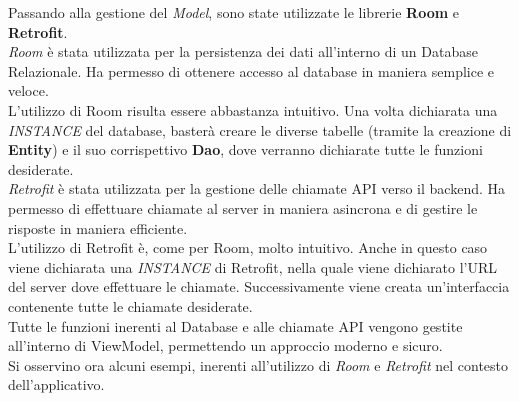 \documentclass{article}
\begin{document}
Passando alla gestione del \textit{Model}, sono state utilizzate le librerie \textbf{Room} e \textbf{Retrofit}.\vspace*{14pt}\\
\textit{Room} è stata utilizzata per la persistenza dei dati all'interno di un Database Relazionale. Ha permesso di ottenere accesso al database in maniera semplice e veloce.\\
L'utilizzo di Room risulta essere abbastanza intuitivo. Una volta dichiarata una \textit{INSTANCE} del database, basterà creare le diverse tabelle (tramite la creazione di \textbf{Entity}) e il suo corrispettivo \textbf{Dao}, dove verranno dichiarate tutte le funzioni desiderate.\vspace*{14pt}\\
\textit{Retrofit} è stata utilizzata per la gestione delle chiamate API verso il backend. Ha permesso di effettuare chiamate al server in maniera asincrona e di gestire le risposte in maniera efficiente.\\
L'utilizzo di Retrofit è, come per Room, molto intuitivo. Anche in questo caso viene dichiarata una \textit{INSTANCE} di Retrofit, nella quale viene dichiarato l'URL del server dove effettuare le chiamate. Successivamente viene creata un'interfaccia contenente tutte le chiamate desiderate.\vspace*{14pt}\\
Tutte le funzioni inerenti al Database e alle chiamate API vengono gestite all'interno di ViewModel, permettendo un approccio moderno e sicuro.\\
Si osservino ora alcuni esempi, inerenti all'utilizzo di \textit{Room} e \textit{Retrofit} nel contesto dell'applicativo.
\end{document}

